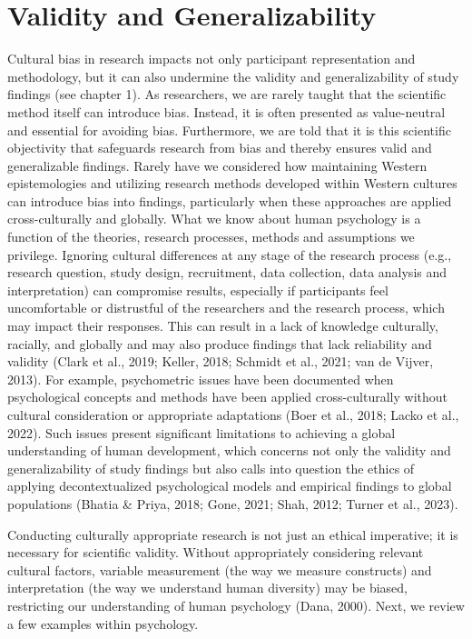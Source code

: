 \documentclass[
  11pt,
]{book}
\begin{document}
\section{Validity and Generalizability}\label{validity-and-generalizability}

Cultural bias in research impacts not only participant representation and methodology, but it can also undermine the validity and generalizability of study findings (see chapter 1). As researchers, we are rarely taught that the scientific method itself can introduce bias. Instead, it is often presented as value-neutral and essential for avoiding bias. Furthermore, we are told that it is this scientific objectivity that safeguards research from bias and thereby ensures valid and generalizable findings. Rarely have we considered how maintaining Western epistemologies and utilizing research methods developed within Western cultures can introduce bias into findings, particularly when these approaches are applied cross-culturally and globally. What we know about human psychology is a function of the theories, research processes, methods and assumptions we privilege. Ignoring cultural differences at any stage of the research process (e.g., research question, study design, recruitment, data collection, data analysis and interpretation) can compromise results, especially if participants feel uncomfortable or distrustful of the researchers and the research process, which may impact their responses. This can result in a lack of knowledge culturally, racially, and globally and may also produce findings that lack reliability and validity (Clark et al., 2019; Keller, 2018; Schmidt et al., 2021; van de Vijver, 2013). For example, psychometric issues have been documented when psychological concepts and methods have been applied cross-culturally without cultural consideration or appropriate adaptations (Boer et al., 2018; Lacko et al., 2022). Such issues present significant limitations to achieving a global understanding of human development, which concerns not only the validity and generalizability of study findings but also calls into question the ethics of applying decontextualized psychological models and empirical findings to global populations (Bhatia \& Priya, 2018; Gone, 2021; Shah, 2012; Turner et al., 2023).

Conducting culturally appropriate research is not just an ethical imperative; it is necessary for scientific validity. Without appropriately considering relevant cultural factors, variable measurement (the way we measure constructs) and interpretation (the way we understand human diversity) may be biased, restricting our understanding of human psychology (Dana, 2000). Next, we review a few examples within psychology.
\end{document}

